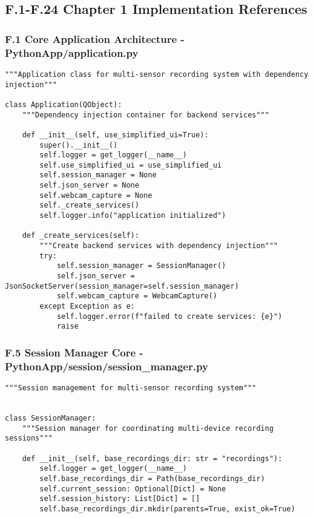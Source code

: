 \documentclass[12pt,a4paper]{report}
\begin{document}
{{\subsection{F.1-F.24 Chapter 1 Implementation References}

\subsubsection{F.1 Core Application Architecture - PythonApp/application.py}

\begin{verbatim}
"""Application class for multi-sensor recording system with dependency injection"""

class Application(QObject):
    """Dependency injection container for backend services"""
    
    def __init__(self, use_simplified_ui=True):
        super().__init__()
        self.logger = get_logger(__name__)
        self.use_simplified_ui = use_simplified_ui
        self.session_manager = None
        self.json_server = None
        self.webcam_capture = None
        self._create_services()
        self.logger.info("application initialized")
    
    def _create_services(self):
        """Create backend services with dependency injection"""
        try:
            self.session_manager = SessionManager()
            self.json_server = JsonSocketServer(session_manager=self.session_manager)
            self.webcam_capture = WebcamCapture()
        except Exception as e:
            self.logger.error(f"failed to create services: {e}")
            raise
\end{verbatim}

\subsubsection{F.5 Session Manager Core - PythonApp/session/session_manager.py}

\begin{verbatim}
"""Session management for multi-sensor recording system"""


class SessionManager:
    """Session manager for coordinating multi-device recording sessions"""

    def __init__(self, base_recordings_dir: str = "recordings"):
        self.logger = get_logger(__name__)
        self.base_recordings_dir = Path(base_recordings_dir)
        self.current_session: Optional[Dict] = None
        self.session_history: List[Dict] = []
        self.base_recordings_dir.mkdir(parents=True, exist_ok=True)


\end{verbatim}}}
\end{document}
